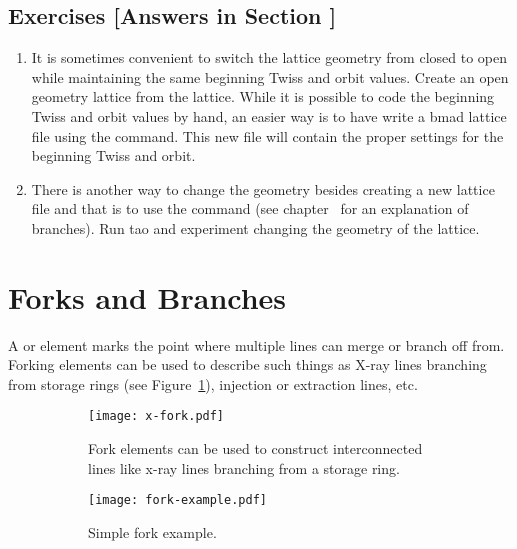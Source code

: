 \documentclass{hitec}     %
\newcommand{\Section}[1]{\section{#1}\vspace*{-1ex}}
\begin{document}
{\newpage

\subsection{Exercises [Answers in Section ]}
\label{s:lat.geom.ex}

\begin{enumerate}[label=\thesection.\arabic{enumi}]
\item
It is sometimes convenient to switch the lattice geometry from closed to open while maintaining the
same beginning Twiss and orbit values. Create an open geometry lattice from the 
lattice. While it is possible to code the beginning Twiss and orbit values by hand, an easier way is
to have \tao write a bmad lattice file using the  command. This new file will contain
the proper settings for the beginning Twiss and orbit.
%
\item
There is another way to change the geometry besides creating a new lattice file and that is to use
the  command (see chapter~ for an explanation of branches). Run tao and
experiment changing the geometry of the  lattice.
\end{enumerate}

\newpage

\Section{Forks and Branches}
\label{s:fork}

A  or  element marks the point where multiple lines can merge or branch off
from. Forking elements can be used to describe such things as X-ray lines branching from storage
rings (see Figure~\ref{f:fork}), injection or extraction lines, etc.

\begin{figure}[tb]
  \centering
  \begin{subfigure}[t]{0.48\textwidth}
    \texttt{[image: x-fork.pdf]}
    \caption{Fork elements can be used to construct interconnected lines like x-ray lines branching
      from a storage ring.}
    \label{f:fork}
  \end{subfigure}
  \hfil
  \begin{subfigure}[t]{0.48\textwidth}
    \texttt{[image: fork-example.pdf]}
    \caption{Simple fork example.}
    \label{f:fork.example}
  \end{subfigure}
  \caption{}
\end{figure}

}
\end{document}
